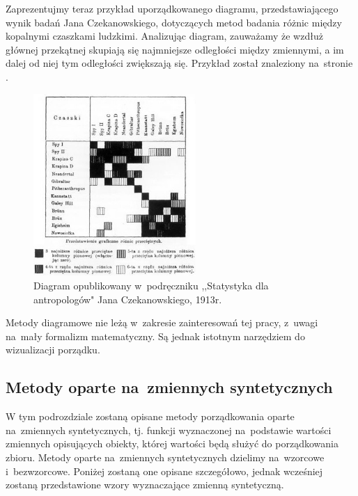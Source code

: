 \documentclass[12pt,a4paper]{report}
\begin{document}

Zaprezentujmy teraz przykład uporządkowanego diagramu, przedstawiającego wynik badań Jana Czekanowskiego, dotyczących metod badania różnic między kopalnymi czaszkami ludzkimi. Analizując diagram, zauważamy że wzdłuż głównej przekątnej skupiają się najmniejsze odległości między zmiennymi, a im dalej od niej tym odległości zwiększają się. Przykład został znaleziony na~stronie \cite{czekanowski}. 
\begin{figure}[h]
\centering
\includegraphics[width=0.55\textwidth]{img/diagram_maczek.jpg}
\caption{Diagram opublikowany w~podręczniku ,,Statystyka dla antropologów" Jana Czekanowskiego, 1913r. \cite{czekanowski}}
\label{fig:obrazek1}
\end{figure}

Metody diagramowe nie leżą w~zakresie zainteresowań tej pracy, z~uwagi na~mały formalizm matematyczny. Są jednak istotnym narzędziem do wizualizacji porządku. 




\subsection{Metody oparte na~zmiennych syntetycznych}

W tym podrozdziale zostaną opisane metody porządkowania oparte na~zmiennych syntetycznych, tj. funkcji wyznaczonej na~podstawie wartości zmiennych opisujących obiekty, której wartości będą służyć do porządkowania zbioru. Metody oparte na~zmiennych syntetycznych dzielimy na~wzorcowe i~bezwzorcowe. Poniżej zostaną one opisane szczegółowo, jednak wcześniej zostaną przedstawione wzory wyznaczające zmienną syntetyczną. 
\end{document}

